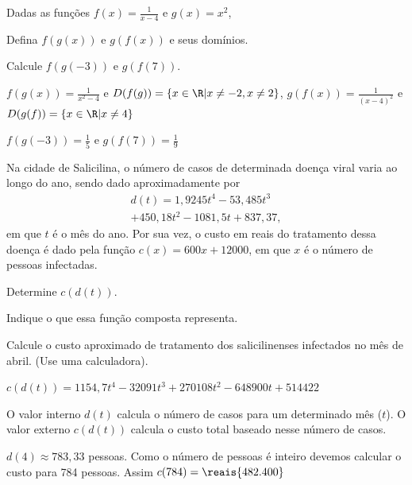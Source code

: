 \begin{exercises*}
\begin{exercise}
  Dadas as funções \(f(x)=\frac{1}{x-4}\) e \(g(x)=x^2\),
  \begin{alphalist}
    \item Defina  $f(g(x))$  e $g(f(x))$ e seus domínios.
    \item Calcule $f(g(-3))$ e $g(f(7))$.
  \end{alphalist}

  \begin{answer}
    \begin{alphalist}
      \item $f(g(x))= \frac{1}{x^2-4}$ e
            $D(f(g))=\{ x \in \R| x \neq -2, x \neq 2 \}$,
            $g(f(x))=\frac{1}{(x-4)^2}$ e
            $D(g(f))=\{ x \in \R| x \neq 4\}$
      \item $f(g(-3))= \frac{1}{5}$ e
            $g(f(7))= \frac{1}{9}$
    \end{alphalist}
  \end{answer}
\end{exercise}

\begin{exercise}
  Na cidade de Salicilina, o número de casos de determinada doença viral
  varia ao longo do ano, sendo dado aproximadamente por
  \begin{multline*}
    d(t) = 1,9245t^4 - 53,485t^3 \\
         + 450,18t^2 - 1081,5t + 837,37,
  \end{multline*}
  em que $t$ é o mês do ano. Por sua vez, o custo em reais do tratamento
  dessa doença é dado pela função $c(x)=600x+12000$, em que $x$ é o número
  de pessoas infectadas.
  \begin{alphalist}
    \item Determine $c(d(t))$.
    \item Indique o que essa função composta representa.
    \item Calcule o custo aproximado de tratamento dos salicilinenses
          infectados no mês de abril. (Use uma calculadora).
  \end{alphalist}

  \begin{answer}
    \begin{alphalist}
      \item $c(d(t)) = 1154,7t^4 - 32091t^3 + 270108t^2 - 648900t + 514422$
      \item O valor interno $d(t)$ calcula o número de casos para um determinado
            mês ($t$). O valor externo $c(d(t))$ calcula o custo total baseado
            nesse número de casos.
      \item $d(4) \approx 783,33$ pessoas. Como o número de pessoas é inteiro
            devemos calcular o custo para 784 pessoas.
            Assim $c(784) = \reais{482.400}$
    \end{alphalist}
  \end{answer}
\end{exercise}

\end{exercises*}

